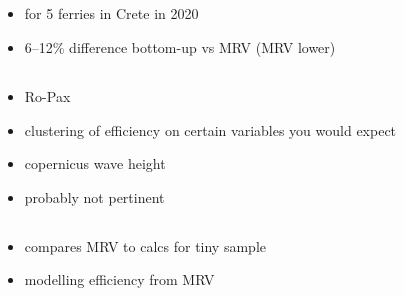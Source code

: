 \documentclass{article}
\newcommand{\paperpath}{../resources/}
\newcommand{\myhref}[2]{\href{run:\paperpath#1}{#2}}
\begin{document}
\subsection{\myhref{Doundoulakis et al 2022 - Comparative analysis of fuel consumption and CO2 emission estimation based on.pdf}{\textcite{doundoulakis2022comparative}}}
\begin{itemize}
    \item for 5 ferries in Crete in 2020
    \item 6–12\% difference bottom-up vs MRV (MRV lower)
\end{itemize}
\subsection{\myhref{Mannarinin et al 2020 - EU-MRV_an_analysis_of_2018s_Ro-Pax_CO2_data.pdf}{\textcite{mannarini2020eu}}}
\begin{itemize}
    \item Ro-Pax
    \item clustering of efficiency on certain variables you would expect
    \item copernicus wave height
    \item probably not pertinent
\end{itemize}
\subsection{\myhref{Hensel et al 2020 - Green shipping using AIS data to assess global emissions.pdf}{\textcite{hensel2020green}}}
\begin{itemize}
    \item compares MRV to calcs for tiny sample
    \item modelling efficiency from MRV
\end{itemize}
\end{document}
